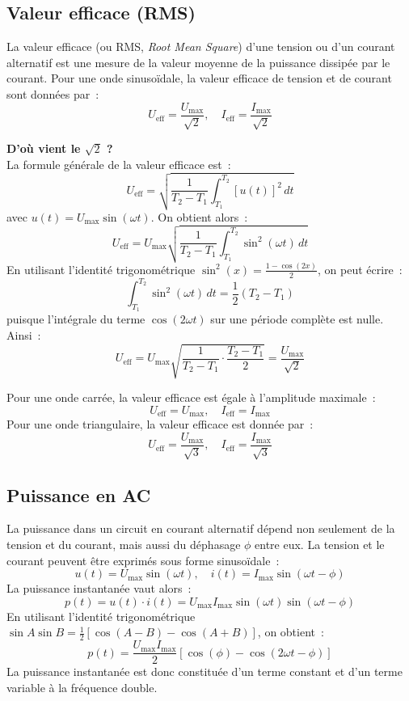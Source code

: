 \subsection{Valeur efficace (RMS)}
La valeur efficace (ou RMS, \emph{Root Mean Square}) d'une tension ou d'un courant alternatif est une mesure de la valeur moyenne de la puissance dissip\'ee par le courant.
Pour une onde sinuso\"idale, la valeur efficace de tension et de courant sont donn\'ees par~:
\[
U_{\text{eff}} = \frac{U_{\text{max}}}{\sqrt{2}}, \quad I_{\text{eff}} = \frac{I_{\text{max}}}{\sqrt{2}}
\]
\begin{Note}{\textbf{D'où vient le $\sqrt{2}$ ?}}\\
La formule g\'en\'erale de la valeur efficace est~:
\[
U_{\text{eff}} = \sqrt{\frac{1}{T_2 - T_1} \int_{T_1}^{T_2} [u(t)]^2 \, dt}
\]
avec \( u(t) = U_{\text{max}}\sin(\omega t) \). On obtient alors~:
\[
U_{\text{eff}} = U_{\text{max}} \sqrt{\frac{1}{T_2 - T_1} \int_{T_1}^{T_2} \sin^2(\omega t)\, dt}
\]
En utilisant l'identit\'e trigonom\'etrique $\sin^2(x) = \frac{1 - \cos(2x)}{2}$, on peut \'ecrire~:
\[
\int_{T_1}^{T_2} \sin^2(\omega t)\, dt = \frac{1}{2}(T_2 - T_1)
\]
puisque l’int\'egrale du terme $\cos(2\omega t)$ sur une p\'eriode compl\`ete est nulle.
Ainsi~:
\[
U_{\text{eff}} = U_{\text{max}} \sqrt{\frac{1}{T_2 - T_1} \cdot \frac{T_2 - T_1}{2}} = \frac{U_{\text{max}}}{\sqrt{2}}
\]
\end{Note}
Pour une onde carr\'ee, la valeur efficace est \'egale à l'amplitude maximale~:
\[U_{\text{eff}} = U_{\text{max}}, \quad I_{\text{eff}} = I_{\text{max}}\]
Pour une onde triangulaire, la valeur efficace est donn\'ee par~:
\[U_{\text{eff}} = \frac{U_{\text{max}}}{\sqrt{3}}, \quad I_{\text{eff}} = \frac{I_{\text{max}}}{\sqrt{3}}\]


\subsection{Puissance en AC}
La puissance dans un circuit en courant alternatif d\'epend non seulement de la tension et du courant, mais aussi du d\'ephasage $\phi$ entre eux.
La tension et le courant peuvent \^etre exprim\'es sous forme sinuso\"idale~:
\[
u(t) = U_{\text{max}} \sin(\omega t), \quad i(t) = I_{\text{max}} \sin(\omega t - \phi)
\]
La puissance instantan\'ee vaut alors~:
\[
p(t) = u(t) \cdot i(t) = U_{\text{max}} I_{\text{max}} \sin(\omega t)\sin(\omega t - \phi)
\]
En utilisant l'identit\'e trigonom\'etrique $\sin A \sin B = \tfrac{1}{2}[\cos(A - B) - \cos(A + B)]$, on obtient~:
\[
p(t) = \frac{U_{\text{max}} I_{\text{max}}}{2} [\cos(\phi) - \cos(2\omega t - \phi)]
\]
La puissance instantan\'ee est donc constitu\'ee d’un terme constant et d’un terme variable à la fr\'equence double.

